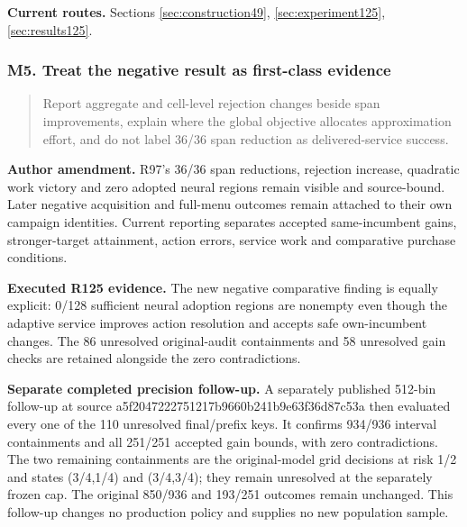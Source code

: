 \noindent\textbf{Current routes.} Sections \ref{sec:construction49}, \ref{sec:experiment125}, \ref{sec:results125}.

\subsubsection{M5. Treat the negative result as first-class evidence}

\begin{quote}\small
Report aggregate and cell-level rejection changes beside span improvements, explain where the global objective allocates approximation effort, and do not label 36/36 span reduction as delivered-service success.
\end{quote}

\noindent\textbf{Author amendment.} R97's 36/36 span reductions, rejection increase, quadratic work victory and zero adopted neural regions remain visible and source-bound. Later negative acquisition and full-menu outcomes remain attached to their own campaign identities. Current reporting separates accepted same-incumbent gains, stronger-target attainment, action errors, service work and comparative purchase conditions.

\noindent\textbf{Executed R125 evidence.} The new negative comparative finding is equally explicit: 0/128 sufficient neural adoption regions are nonempty even though the adaptive service improves action resolution and accepts safe own-incumbent changes. The 86 unresolved original-audit containments and 58 unresolved gain checks are retained alongside the zero contradictions.

\noindent\textbf{Separate completed precision follow-up.} A separately published 512-bin follow-up at source a5f2047222751217b9660b241b9e63f36d87c53a then evaluated every one of the 110 unresolved final/prefix keys. It confirms 934/936 interval containments and all 251/251 accepted gain bounds, with zero contradictions. The two remaining containments are the original-model grid decisions at risk 1/2 and states (3/4,1/4) and (3/4,3/4); they remain unresolved at the separately frozen cap. The original 850/936 and 193/251 outcomes remain unchanged. This follow-up changes no production policy and supplies no new population sample.

